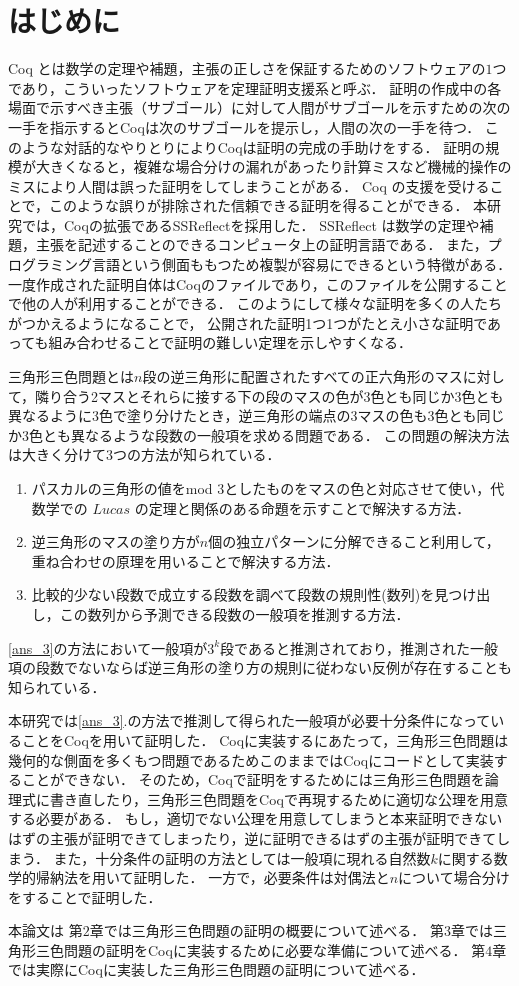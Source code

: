 \section{はじめに}
Coq とは数学の定理や補題，主張の正しさを保証するためのソフトウェアの$1$つであり，こういったソフトウェアを定理証明支援系と呼ぶ．
証明の作成中の各場面で示すべき主張（サブゴール）に対して人間がサブゴールを示すための次の一手を指示するとCoqは次のサブゴールを提示し，人間の次の一手を待つ．
このような対話的なやりとりによりCoqは証明の完成の手助けをする．
証明の規模が大きくなると，複雑な場合分けの漏れがあったり計算ミスなど機械的操作のミスにより人間は誤った証明をしてしまうことがある．
 Coq の支援を受けることで，このような誤りが排除された信頼できる証明を得ることができる．
本研究では，Coqの拡張であるSSReflectを採用した．
 SSReflect は数学の定理や補題，主張を記述することのできるコンピュータ上の証明言語である．
また，プログラミング言語という側面ももつため複製が容易にできるという特徴がある．
一度作成された証明自体はCoqのファイルであり，このファイルを公開することで他の人が利用することができる．
このようにして様々な証明を多くの人たちがつかえるようになることで， 公開された証明1つ1つがたとえ小さな証明であっても組み合わせることで証明の難しい定理を示しやすくなる．

三角形三色問題とは$n$段の逆三角形に配置されたすべての正六角形のマスに対して，隣り合う2マスとそれらに接する下の段のマスの色が$3$色とも同じか3色とも異なるように3色で塗り分けたとき，逆三角形の端点の3マスの色も$3$色とも同じか3色とも異なるような段数の一般項を求める問題である．
この問題の解決方法は大きく分けて3つの方法が知られている．\cite{tri}
\begin{enumerate}
\item \label{ans_1}
  パスカルの三角形の値をmod $3$としたものをマスの色と対応させて使い，代数学での $Lucas$ の定理と関係のある命題を示すことで解決する方法．
\item \label{ans_2}
  逆三角形のマスの塗り方が$n$個の独立パターンに分解できること利用して，重ね合わせの原理を用いることで解決する方法．
\item \label{ans_3}
  比較的少ない段数で成立する段数を調べて段数の規則性(数列)を見つけ出し，この数列から予測できる段数の一般項を推測する方法．
\end{enumerate}
\ref{ans_3}の方法において一般項が$3^k$段であると推測されており，推測された一般項の段数でないならば逆三角形の塗り方の規則に従わない反例が存在することも知られている．

本研究では\ref{ans_3}.の方法で推測して得られた一般項が必要十分条件になっていることをCoqを用いて証明した．
Coqに実装するにあたって，三角形三色問題は幾何的な側面を多くもつ問題であるためこのままではCoqにコードとして実装することができない．
そのため，Coqで証明をするためには三角形三色問題を論理式に書き直したり，三角形三色問題をCoqで再現するために適切な公理を用意する必要がある．
もし，適切でない公理を用意してしまうと本来証明できないはずの主張が証明できてしまったり，逆に証明できるはずの主張が証明できてしまう．
また，十分条件の証明の方法としては一般項に現れる自然数$k$に関する数学的帰納法を用いて証明した．
一方で，必要条件は対偶法と$n$について場合分けをすることで証明した．

本論文は
第$2$章では三角形三色問題の証明の概要について述べる．
第$3$章では三角形三色問題の証明をCoqに実装するために必要な準備について述べる．
第$4$章では実際にCoqに実装した三角形三色問題の証明について述べる．
